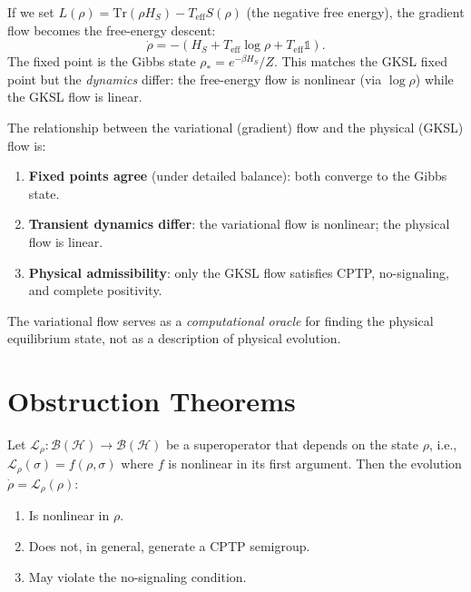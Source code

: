 \begin{proposition}
\label{prop:c9:freeenergy}
If we set $L(\rho) = \mathrm{Tr}(\rho H_S) - T_{\mathrm{eff}} S(\rho)$
(the negative free energy), the gradient flow becomes the free-energy
descent:
\begin{equation}
  \dot{\rho} = -(H_S + T_{\mathrm{eff}} \log\rho + T_{\mathrm{eff}}\mathbb{1}).
  \label{eq:c9:free_energy}
\end{equation}
The fixed point is the Gibbs state $\rho_* = e^{-\beta H_S}/Z$.
This matches the GKSL fixed point but the \emph{dynamics} differ:
the free-energy flow is nonlinear (via $\log\rho$) while the GKSL
flow is linear.
\end{proposition}

\begin{corollary}
\label{cor:c9:duality}
The relationship between the variational (gradient) flow and the physical
(GKSL) flow is:
\begin{enumerate}
\item \textbf{Fixed points agree} (under detailed balance): both converge
  to the Gibbs state.
\item \textbf{Transient dynamics differ}: the variational flow is
  nonlinear; the physical flow is linear.
\item \textbf{Physical admissibility}: only the GKSL flow satisfies
  CPTP, no-signaling, and complete positivity.
\end{enumerate}
The variational flow serves as a \emph{computational oracle} for finding
the physical equilibrium state, not as a description of physical evolution.
\end{corollary}


\section{Obstruction Theorems}
\label{sec:c9:obstruction}

\begin{theorem}
\label{thm:c9:obstruction}
Let $\mathcal{L}_\rho : \mathcal{B}(\mathcal{H}) \to
\mathcal{B}(\mathcal{H})$ be a superoperator that depends on the
state $\rho$, i.e., $\mathcal{L}_\rho(\sigma) = f(\rho, \sigma)$
where $f$ is nonlinear in its first argument.  Then the evolution
$\dot{\rho} = \mathcal{L}_\rho(\rho)$:
\begin{enumerate}
\item[(i)] Is nonlinear in $\rho$.
\item[(ii)] Does not, in general, generate a CPTP semigroup.
\item[(iii)] May violate the no-signaling condition.
\end{enumerate}
\end{theorem}

